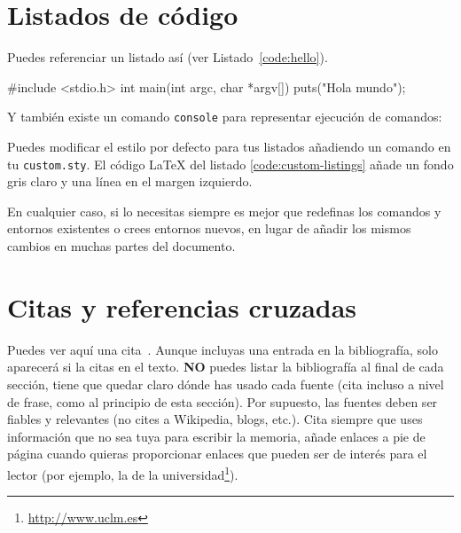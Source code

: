 \section{Listados de código}
\label{sec:listado}

\noindent
Puedes referenciar un listado así (ver Listado~\ref{code:hello}).

\begin{listing}[
  float=ht,
  language = C,
  caption  = {«Hola mundo» en C},
  label    = code:hello]
#include <stdio.h>
int main(int argc, char *argv[]) {
    puts("Hola mundo\n");
}
\end{listing}

Y también existe un comando \texttt{console} para representar ejecución de comandos:


Puedes modificar el estilo por defecto para tus listados añadiendo un comando  en tu \texttt{custom.sty}. El código \LaTeX{} del listado \ref{code:custom-listings} añade un fondo gris claro y una línea en el margen izquierdo.

\begin{listing}[
  float=h!,
  caption  = {Personalizando los listados de código},
  label    = code:custom-listings]
\end{listing}

En cualquier caso, si lo necesitas siempre es mejor que redefinas los comandos y entornos existentes o crees entornos nuevos, en lugar de añadir los mismos cambios en muchas partes del documento.


\section{Citas y referencias cruzadas}

Puedes ver aquí una cita~\cite{design_patterns}. Aunque incluyas una entrada en la bibliografía, solo aparecerá si la citas en el texto. \textbf{NO} puedes listar la bibliografía al final de cada sección, tiene que quedar claro dónde has usado cada fuente (cita incluso a nivel de frase, como al principio de esta sección). Por supuesto, las fuentes deben ser fiables y relevantes (no cites a Wikipedia, blogs, etc.). Cita siempre que uses información que no sea tuya para escribir la memoria, añade enlaces a pie de página cuando quieras proporcionar enlaces que pueden ser de interés para el lector (por ejemplo, la de la universidad\footnote{\url{http://www.uclm.es}}).

